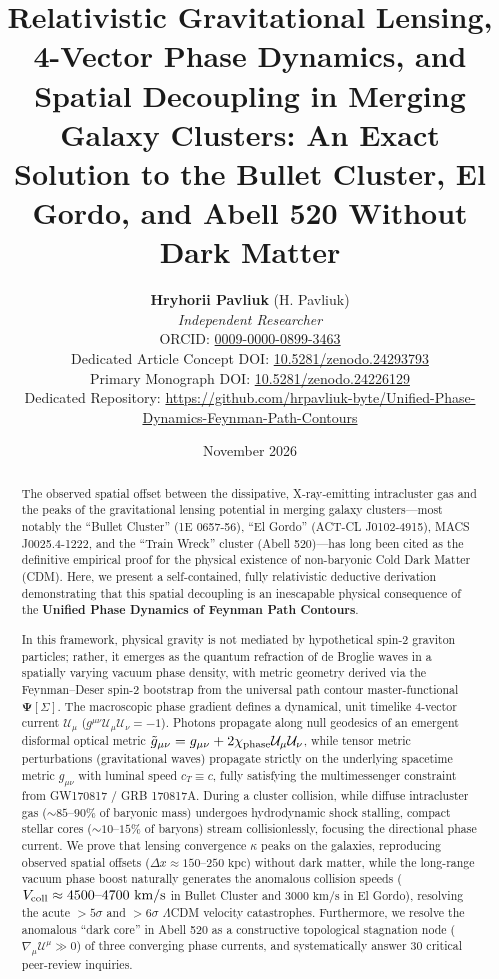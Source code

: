 \documentclass[11pt,a4paper]{article}
\title{\textbf{Relativistic Gravitational Lensing, 4-Vector Phase Dynamics, and Spatial Decoupling in Merging Galaxy Clusters: An Exact Solution to the Bullet Cluster, El Gordo, and Abell 520 Without Dark Matter}}
\author{\textbf{Hryhorii Pavliuk} (H. Pavliuk)\\
\textit{Independent Researcher}\\
\small ORCID: \href{https://orcid.org/0009-0000-0899-3463}{0009-0000-0899-3463}\\
Dedicated Article Concept DOI: \href{https://doi.org/10.5281/zenodo.24293793}{10.5281/zenodo.24293793}\\
Primary Monograph DOI: \href{https://doi.org/10.5281/zenodo.24226129}{10.5281/zenodo.24226129}\\
Dedicated Repository: \url{https://github.com/hrpavliuk-byte/Unified-Phase-Dynamics-Feynman-Path-Contours}}
\date{November 2026}
\begin{document}
\maketitle

\begin{abstract}
The observed spatial offset between the dissipative, X-ray-emitting intracluster gas and the peaks of the gravitational lensing potential in merging galaxy clusters---most notably the ``Bullet Cluster'' (1E 0657-56), ``El Gordo'' (ACT-CL J0102-4915), MACS J0025.4-1222, and the ``Train Wreck'' cluster (Abell 520)---has long been cited as the definitive empirical proof for the physical existence of non-baryonic Cold Dark Matter (CDM). Here, we present a self-contained, fully relativistic deductive derivation demonstrating that this spatial decoupling is an inescapable physical consequence of the \textbf{Unified Phase Dynamics of Feynman Path Contours}. 

In this framework, physical gravity is not mediated by hypothetical spin-2 graviton particles; rather, it emerges as the quantum refraction of de Broglie waves in a spatially varying vacuum phase density, with metric geometry derived via the Feynman--Deser spin-2 bootstrap from the universal path contour master-functional $\mathbf{\Psi}[\Sigma]$. The macroscopic phase gradient defines a dynamical, unit timelike 4-vector current $\mathcal{U}_\mu$ ($g^{\mu\nu}\mathcal{U}_\mu\mathcal{U}_\nu = -1$). Photons propagate along null geodesics of an emergent disformal optical metric $\tilde{g}_{\mu\nu} = g_{\mu\nu} + 2\chi_{\rm phase} \mathcal{U}_\mu \mathcal{U}_\nu$, while tensor metric perturbations (gravitational waves) propagate strictly on the underlying spacetime metric $g_{\mu\nu}$ with luminal speed $c_T \equiv c$, fully satisfying the multimessenger constraint from GW170817 / GRB 170817A. During a cluster collision, while diffuse intracluster gas ($\sim 85\text{--}90\%$ of baryonic mass) undergoes hydrodynamic shock stalling, compact stellar cores ($\sim 10\text{--}15\%$ of baryons) stream collisionlessly, focusing the directional phase current. We prove that lensing convergence $\kappa$ peaks on the galaxies, reproducing observed spatial offsets ($\Delta x \approx 150\text{--}250\text{ kpc}$) without dark matter, while the long-range vacuum phase boost naturally generates the anomalous collision speeds ($V_{\rm coll} \approx 4500\text{--}4700\text{ km/s}$ in Bullet Cluster and $3000\text{ km/s}$ in El Gordo), resolving the acute $> 5\sigma$ and $> 6\sigma$ $\Lambda$CDM velocity catastrophes. Furthermore, we resolve the anomalous ``dark core'' in Abell 520 as a constructive topological stagnation node ($\nabla_\mu \mathcal{U}^\mu \gg 0$) of three converging phase currents, and systematically answer 30 critical peer-review inquiries.
\end{abstract}
\end{document}
